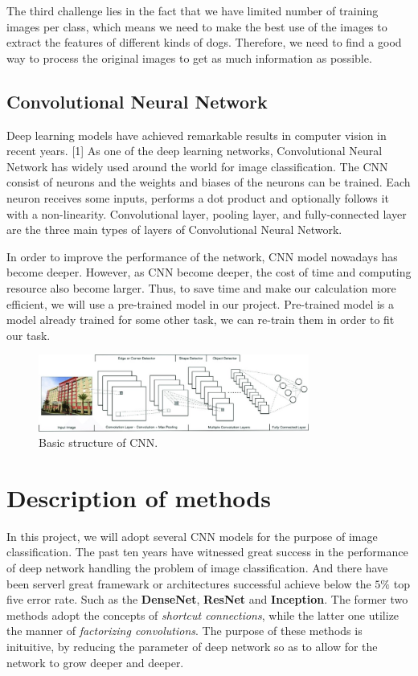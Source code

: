 \documentclass{article}
\begin{document}
The third challenge lies in the fact that we have limited number of training images per class, which means we need to make the best use of the images to extract the features of different kinds of dogs. Therefore, we need to find a good way to process the original images to get as much information as possible. 

\subsection{Convolutional Neural Network}

Deep learning models have achieved remarkable results in computer vision in recent years. [1] As one of the deep learning networks, Convolutional Neural Network has widely used around the world for image classification. The CNN consist of neurons and the weights and biases of the neurons can be trained. Each neuron receives some inputs, performs a dot product and optionally follows it with a non-linearity. Convolutional layer, pooling layer, and fully-connected layer are the three main types of layers of Convolutional Neural Network.

In order to improve the performance of the network, CNN model nowadays has become deeper. However, as CNN become deeper, the cost of time and computing resource also become larger. Thus, to save time and make our calculation more efficient, we will use a pre-trained model in our project. Pre-trained model is a model already trained for some other task, we can re-train them in order to fit our task.

\begin{figure}[H]
	\centering
	\includegraphics[width=3.5in]{pics/CNN} 
	\caption{Basic structure of CNN.}
\end{figure}

\section{Description of methods}

In this project, we will adopt several CNN models for the purpose of image classification. 
The past ten years have witnessed great success in the performance of deep network handling the problem of image classification. 
And there have been serverl great framewark or architectures successful achieve below the $5\%$ top five error rate. 
Such as the \textbf{DenseNet}, \textbf{ResNet} and \textbf{Inception}. 
The former two methods adopt the concepts of \emph{shortcut connections}, while the latter one utilize the manner of \emph{factorizing convolutions}. 
The purpose of these methods is inituitive, by reducing the parameter of deep network so as to allow for the network to grow deeper and deeper. 
\end{document}
